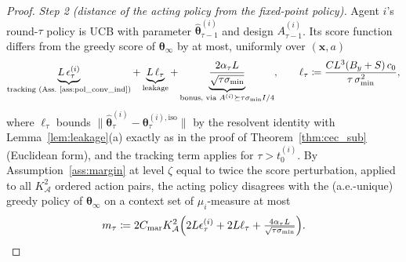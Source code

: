 \documentclass[11pt]{article}
\begin{document}
\begin{proof}
\emph{Step 2 (distance of the acting policy from the fixed-point
policy).}  Agent $i$'s round-$\tau$ policy is UCB with parameter
$\widehat{\bm\theta}_{\tau-1}^{(i)}$ and design $A_{\tau-1}^{(i)}$.
Its score function differs from the greedy score of
$\bm\theta_\infty$ by at most, uniformly over $(\bm x,a)$ \begin{equation}
\underbrace{L\,\epsilon_\tau^{(i)}}_{\text{tracking (Ass.~\ref{ass:pol_conv_ind})}}
+\underbrace{L\,\ell_\tau}_{\text{leakage}}
+\underbrace{\frac{2\alpha_\tau L}{\sqrt{\tau\sigma_{\min}}}}_{\text{bonus, via }A^{(i)}\succeq\tau\sigma_{\min}I/4},
\qquad
\ell_\tau\coloneqq\frac{CL^3(B_y+S)\,c_0}{\tau\,\sigma_{\min}^{2}} ,
\label{eq:ind_score_pert}
\end{equation}
where $\ell_\tau$ bounds
$\|\widehat{\bm\theta}_\tau^{(i)}-\bm\theta_\tau^{(i),\mathrm{iso}}\|$
by the resolvent identity with Lemma~\ref{lem:leakage}(a) exactly as
in the proof of Theorem~\ref{thm:cec_sub} (Euclidean form), and the
tracking term applies for $\tau>t_0^{(i)}$.  By
Assumption~\ref{ass:margin} at level $\zeta$ equal to twice the score
perturbation, applied to all $K_{\mathcal A}^2$ ordered action pairs,
the acting policy disagrees with the (a.e.-unique) greedy policy of
$\bm\theta_\infty$ on a context set of $\mu_i$-measure at most
\begin{equation}
m_\tau\coloneqq 2C_{\mathrm{mar}}K_{\mathcal A}^2
\Bigl(2L\epsilon_\tau^{(i)}+2L\ell_\tau
+\tfrac{4\alpha_\tau L}{\sqrt{\tau\sigma_{\min}}}\Bigr).
\label{eq:ind_mismatch}
\end{equation}


\end{proof}
\end{document}

